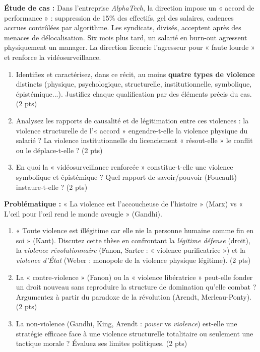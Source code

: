 \documentclass[11pt]{article}
\begin{document}
\begin{exercice}
\textbf{Étude de cas :} Dans l'entreprise \textit{AlphaTech}, la direction impose un « accord de performance » : suppression de 15\% des effectifs, gel des salaires, cadences accrues contrôlées par algorithme. Les syndicats, divisés, acceptent après des menaces de délocalisation. Six mois plus tard, un salarié en burn-out agressent physiquement un manager. La direction licencie l'agresseur pour « faute lourde » et renforce la vidéosurveillance.

\begin{enumerate}
    \item Identifiez et caractérisez, dans ce récit, au moins \textbf{quatre types de violence} distincts (physique, psychologique, structurelle, institutionnelle, symbolique, épistémique...). Justifiez chaque qualification par des éléments précis du cas. \hfill (2 pts)
    \item Analysez les rapports de causalité et de légitimation entre ces violences : la violence structurelle de l'« accord » engendre-t-elle la violence physique du salarié ? La violence institutionnelle du licenciement « résout-elle » le conflit ou le déplace-t-elle ? \hfill (2 pts)
    \item En quoi la « vidéosurveillance renforcée » constitue-t-elle une violence symbolique et épistémique ? Quel rapport de savoir/pouvoir (Foucault) instaure-t-elle ? \hfill (2 pts)
\end{enumerate}
\end{exercice}

\begin{exercice}
\textbf{Problématique :} « La violence est l'accoucheuse de l'histoire » (Marx) vs « L'œil pour l'œil rend le monde aveugle » (Gandhi).

\begin{enumerate}
    \item « Toute violence est illégitime car elle nie la personne humaine comme fin en soi » (Kant). Discutez cette thèse en confrontant la \textit{légitime défense} (droit), la \textit{violence révolutionnaire} (Fanon, Sartre : « violence purificatrice ») et la \textit{violence d'État} (Weber : monopole de la violence physique légitime). \hfill (2 pts)
    \item La « contre-violence » (Fanon) ou la « violence libératrice » peut-elle fonder un droit nouveau sans reproduire la structure de domination qu'elle combat ? Argumentez à partir du paradoxe de la révolution (Arendt, Merleau-Ponty). \hfill (2 pts)
    \item La non-violence (Gandhi, King, Arendt : \textit{power} vs \textit{violence}) est-elle une stratégie efficace face à une violence structurelle totalitaire ou seulement une tactique morale ? Évaluez ses limites politiques. \hfill (2 pts)
\end{enumerate}
\end{exercice}
\end{document}
